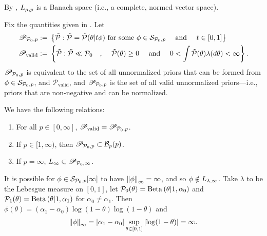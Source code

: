 By \citep[Theorem 5.2.1]{dudley:2018:real}, ${L_{\mu,p}}$ is a Banach
space (i.e., a complete, normed vector space).




\begin{lem}
%
Fix the quantities given in .  Let
%
\begin{align*}
%
\mathscr{P}_{\pbase,p} :={}&
    \left\{ \ptil: \ptil = \ptil(\theta \vert \t \phi) \textrm{ for some }
        \phi \in \pertset \mathtxt{ and } \t \in [0, 1]
    \right\} \\
\mathscr{P}_{\mathrm{valid}} :={}&
    \left\{ \ptil:
        \ptil \ll \pbase \mathtxt{, }
        \ptil(\theta) \ge 0 \mathtxt{ and }
        0 < \int \ptil(\theta) \lambda(d\theta) < \infty
    \right\}.
%
\end{align*}
%
$\mathscr{P}_{\mathcal{P}_{0},p}$ is equivalent to the set of all unnormalized priors
that can be formed from $\phi \in \mathcal{S}_{\mathcal{P}_{0},p}$, and $\mathscr{P}_{\mathrm{valid}}$,
and $\mathscr{P}_{\mathcal{P}_{0},p}$ is the set of all valid unnormalized priors---i.e.,
priors that are non-negative and can be normalized.

We have the following relations:
%
\begin{enumerate}
%
    \item {}
    For all $p \in [0, \infty]$,
    $\mathscr{P}_{\mathrm{valid}} = \mathscr{P}_{\mathcal{P}_{0},p}$.
%
    \item {}
    If $p \in [1, \infty)$, then $\mathscr{P}_{\mathcal{P}_{0},p} \subset \mathcal{B}_{p}(p)$.
%
    \item {}
    If $p = \infty$, ${L_{\infty}} \subset \mathscr{P}_{\mathcal{P}_{0},\infty}$.
%
%
\end{enumerate}
%
\end{lem}

\begin{ex}
%
It is possible for $\phi \in \mathcal{S}_{\mathcal{P}_{0},p}[\infty]$ to have $\left\Vert\phi\right\Vert_{\infty} =
\infty$, and so $\phi \notin {L_{\lambda,\infty}}$.  Take $\lambda$ to be the
Lebesgue measure on $[0,1]$, let $\mathcal{P}_{0}(\theta) = \mathrm{Beta}\left(\theta \vert 1,
\alpha_0\right)$ and $\mathcal{P}_{1}(\theta) = \mathrm{Beta}\left(\theta \vert 1, \alpha_1\right)$ for
$\alpha_0 \ne \alpha_1$.  Then $\phi(\theta) = (\alpha_1 - \alpha_0) \log(1 -
\theta) \log(1 - \theta)$
%
and
%
\begin{align*}
%
\norminf{\phi} =
    \abs{\alpha_1 - \alpha_0} \sup_{\theta \in [0,1]} \abs{\log(1 - \theta)} =
    \infty.
%
\end{align*}
%
\end{ex}

